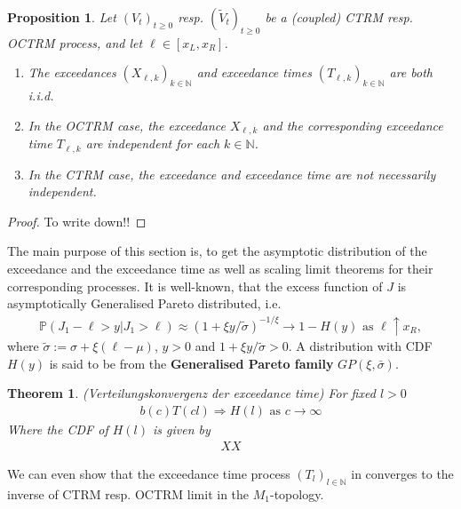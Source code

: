\documentclass[12pt]{article}
\newtheorem{theorem}[equation]{Theorem}
\newtheorem{proposition}[equation]{Proposition}
\newcommand{\N}{\mathbb{N}}
\newcommand{\PP}{\mathbb{P}}
\newcommand{\1}{\mathbf 1}
\begin{document}
\begin{proposition}\label{lem:independence}
Let $(V_t)_{t \geq 0}$ resp. $(\tilde{V}_t)_{t \geq 0}$ be a (coupled) CTRM resp. OCTRM process, and let $\ell \in [x_L,x_R]$.
\begin{enumerate}
\item[(i)]
The exceedances $(X_{\ell, k})_{k \in \mathbb N}$ and exceedance times 
$(T_{\ell, k})_{k \in \mathbb N}$ are both i.i.d.
\item[(ii)]
In the OCTRM case, the exceedance $X_{\ell, k}$ and the corresponding exceedance time $T_{\ell, k}$ are independent for each $k \in \mathbb N$. 
\item[(iii)]
In the CTRM case, the exceedance and exceedance time are not necessarily independent. 
\end{enumerate}
\end{proposition}\begin{proof}
To write down!!
\end{proof}
The main purpose of this section is, to get the asymptotic distribution of the exceedance and the exceedance time as well as scaling limit theorems for their corresponding processes. It is well-known, that the excess function of $J$ is asymptotically Generalised Pareto distributed, i.e.
\begin{align*}
\PP(J_1 - \ell > y | J_1 > \ell) 
\approx (1+ \xi y / \tilde \sigma)^{-1/\xi} \rightarrow 1 - H(y) \text{ as } \ell \uparrow x_R,
\end{align*}
where $\tilde \sigma :=\sigma + \xi(\ell-\mu)$, $y>0$ and $1+\xi y/\tilde \sigma >0$. A distribution with CDF $H(y)$ is said to be from the \textbf{Generalised Pareto family}
$GP(\xi,\bar \sigma)$.\\  

\begin{theorem}(Verteilungskonvergenz der exceedance time)
For fixed $l>0$
\begin{align}
b(c) T(cl) \Rightarrow H(l) \text{ as } c \rightarrow \infty
\end{align} 
Where the CDF of $H(l)$ is given by
\begin{align*}
XX
\end{align*}
\end{theorem}

We can even show that the exceedance time process $(T_l)_{l \in \N}$ in converges to the inverse of CTRM resp. OCTRM limit in the $M_1$-topology.
\end{document}
